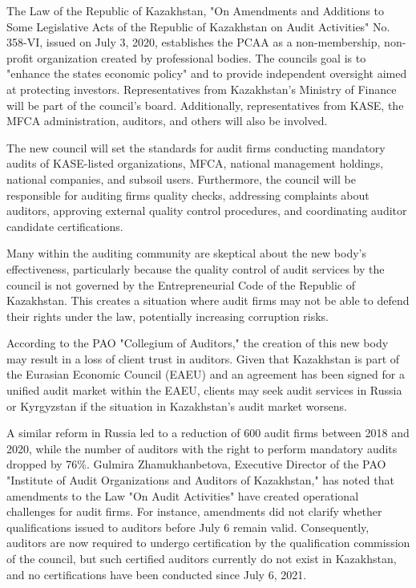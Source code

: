 \begin{multicols}{2}
The Law of the Republic of Kazakhstan, "On Amendments and Additions to
Some Legislative Acts of the Republic of Kazakhstan on Audit Activities"
No. 358-VI, issued on July 3, 2020, establishes the PCAA as a
non-membership, non-profit organization created by professional bodies.
The council\textquotesingle s goal is to "enhance the
state\textquotesingle s economic policy" and to provide independent
oversight aimed at protecting investors. Representatives from
Kazakhstan's Ministry of Finance will be part of the council's board.
Additionally, representatives from KASE, the MFCA administration,
auditors, and others will also be involved.

The new council will set the standards for audit firms conducting
mandatory audits of KASE-listed organizations, MFCA, national management
holdings, national companies, and subsoil users. Furthermore, the
council will be responsible for auditing firms\textquotesingle{} quality
checks, addressing complaints about auditors, approving external quality
control procedures, and coordinating auditor candidate certifications.

Many within the auditing community are skeptical about the new body's
effectiveness, particularly because the quality control of audit
services by the council is not governed by the Entrepreneurial Code of
the Republic of Kazakhstan. This creates a situation where audit firms
may not be able to defend their rights under the law, potentially
increasing corruption risks.

According to the PAO "Collegium of Auditors," the creation of this new
body may result in a loss of client trust in auditors. Given that
Kazakhstan is part of the Eurasian Economic Council (EAEU) and an
agreement has been signed for a unified audit market within the EAEU,
clients may seek audit services in Russia or Kyrgyzstan if the situation
in Kazakhstan's audit market worsens.

A similar reform in Russia led to a reduction of 600 audit firms between
2018 and 2020, while the number of auditors with the right to perform
mandatory audits dropped by 76\%. Gulmira Zhamukhanbetova, Executive
Director of the PAO "Institute of Audit Organizations and Auditors of
Kazakhstan," has noted that amendments to the Law "On Audit Activities"
have created operational challenges for audit firms. For instance,
amendments did not clarify whether qualifications issued to auditors
before July 6 remain valid. Consequently, auditors are now required to
undergo certification by the qualification commission of the council,
but such certified auditors currently do not exist in Kazakhstan, and no
certifications have been conducted since July 6, 2021.


\end{multicols}
